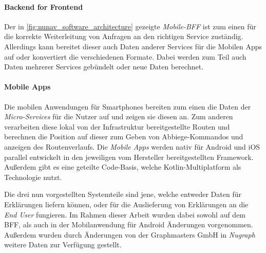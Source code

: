 \paragraph{Backend for Frontend} Der in \autoref{fig:nunav_software_architecture} gezeigte \textit{Mobile-BFF} ist zum einen für die korrekte Weiterleitung von Anfragen an den richtigen Service zuständig. Allerdings kann bereitet dieser auch Daten anderer Services für die Mobilen Apps auf oder konvertiert die verschiedenen Formate. Dabei werden zum Teil auch Daten mehrerer Services gebündelt oder neue Daten berechnet. 

\paragraph{Mobile Apps} Die mobilen Anwendungen für Smartphones bereiten zum einen die Daten der \textit{Micro-Services} für die Nutzer auf und zeigen sie diesen an. Zum anderen verarbeiten diese lokal von der Infrastruktur bereitgestellte Routen und berechnen die Position auf dieser zum Geben von Abbiege-Kommandos und anzeigen des Routenverlaufs. Die \textit{Mobile Apps} werden nativ für Android und iOS parallel entwickelt in den jeweiligen vom Hersteller bereitgestellten Framework. Außerdem gibt es eine geteilte Code-Basis, welche Kotlin-Multiplatform als Technologie nutzt.

\bigskip

Die drei nun vorgestellten Systemteile sind jene, welche entweder Daten für Erklärungen liefern können, oder für die Auslieferung von Erklärungen an die \textit{End User} fungieren. Im Rahmen dieser Arbeit wurden dabei sowohl auf dem BFF, als auch in der Mobilanwendung für Android Änderungen vorgenommen. Außerdem wurden durch Änderungen von der Graphmasters GmbH in \textit{Nugraph} weitere Daten zur Verfügung gestellt.